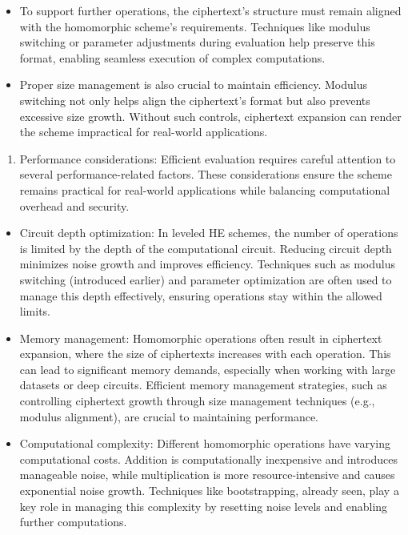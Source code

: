 \documentclass[
  letterpaper,
  DIV=11,
  numbers=noendperiod,
  oneside]{scrartcl}
\providecommand{\tightlist}{%
  \setlength{\itemsep}{0pt}\setlength{\parskip}{0pt}}\usepackage{longtable,booktabs,array}
\begin{document}
\begin{itemize}
  \begin{itemize}
  \item
    To support further operations, the ciphertext's structure must
    remain aligned with the homomorphic scheme's requirements.
    Techniques like modulus switching or parameter adjustments during
    evaluation help preserve this format, enabling seamless execution of
    complex computations.
  \item
    Proper size management is also crucial to maintain efficiency.
    Modulus switching not only helps align the ciphertext's format but
    also prevents excessive size growth. Without such controls,
    ciphertext expansion can render the scheme impractical for
    real-world applications.
  \end{itemize}

  \begin{enumerate}
  \def\labelenumi{\arabic{enumi}.}
  \setcounter{enumi}{3}
  \tightlist
  \item
    Performance considerations: Efficient evaluation requires careful
    attention to several performance-related factors. These
    considerations ensure the scheme remains practical for real-world
    applications while balancing computational overhead and security.
  \end{enumerate}

  \begin{itemize}
  \item
    Circuit depth optimization: In leveled HE schemes, the number of
    operations is limited by the depth of the computational circuit.
    Reducing circuit depth minimizes noise growth and improves
    efficiency. Techniques such as modulus switching (introduced
    earlier) and parameter optimization are often used to manage this
    depth effectively, ensuring operations stay within the allowed
    limits.
  \item
    Memory management: Homomorphic operations often result in ciphertext
    expansion, where the size of ciphertexts increases with each
    operation. This can lead to significant memory demands, especially
    when working with large datasets or deep circuits. Efficient memory
    management strategies, such as controlling ciphertext growth through
    size management techniques (e.g., modulus alignment), are crucial to
    maintaining performance.
  \item
    Computational complexity: Different homomorphic operations have
    varying computational costs. Addition is computationally inexpensive
    and introduces manageable noise, while multiplication is more
    resource-intensive and causes exponential noise growth. Techniques
    like bootstrapping, already seen, play a key role in managing this
    complexity by resetting noise levels and enabling further
    computations.
  \end{itemize}


\end{itemize}
\end{document}
